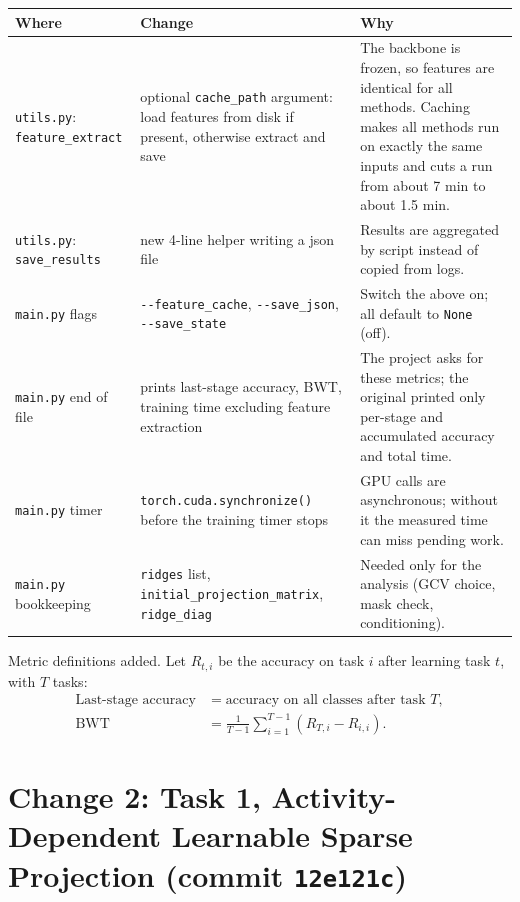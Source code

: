 \documentclass[11pt,a4paper]{article}
\begin{document}
\begin{table}[h]
\centering
\begin{tabularx}{\textwidth}{>{\raggedright\arraybackslash}p{3.3cm}LL}
\toprule
Where & Change & Why \\
\midrule
\texttt{utils.py}: \texttt{feature\_extract} &
optional \texttt{cache\_path} argument: load features from disk if present, otherwise extract and save &
The backbone is frozen, so features are identical for all methods. Caching makes all methods run
on exactly the same inputs and cuts a run from about 7 min to about 1.5 min. \\
\texttt{utils.py}: \texttt{save\_results} & new 4-line helper writing a json file &
Results are aggregated by script instead of copied from logs. \\
\texttt{main.py} flags & \texttt{-{}-feature\_cache}, \texttt{-{}-save\_json}, \texttt{-{}-save\_state} &
Switch the above on; all default to \texttt{None} (off). \\
\texttt{main.py} end of file & prints last-stage accuracy, BWT, training time excluding feature extraction &
The project asks for these metrics; the original printed only per-stage and accumulated accuracy and total time. \\
\texttt{main.py} timer & \texttt{torch.cuda.synchronize()} before the training timer stops &
GPU calls are asynchronous; without it the measured time can miss pending work. \\
\texttt{main.py} bookkeeping & \texttt{ridges} list, \texttt{initial\_projection\_matrix}, \texttt{ridge\_diag} &
Needed only for the analysis (GCV choice, mask check, conditioning). \\
\bottomrule
\end{tabularx}
\end{table}

Metric definitions added. Let $R_{t,i}$ be the accuracy on task $i$ after learning task $t$,
with $T$ tasks:
\begin{align*}
\text{Last-stage accuracy} &= \text{accuracy on all classes after task } T, \\
\text{BWT} &= \frac{1}{T-1}\sum_{i=1}^{T-1}\left(R_{T,i} - R_{i,i}\right).
\end{align*}

\section{Change 2: Task 1, Activity-Dependent Learnable Sparse Projection (commit \texttt{12e121c})}
\end{document}

